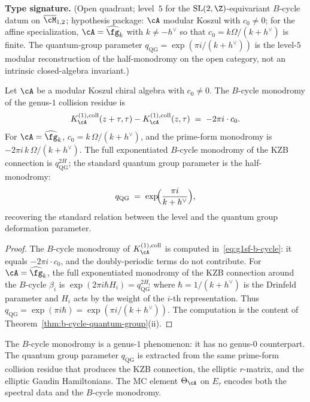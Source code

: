 \begin{theorem}
\label{thm:g1sf-b-cycle-monodromy}
\textbf{Type signature.} (Open quadrant; level~$5$ for the
$\mathrm{SL}(2,\Z)$-equivariant $B$-cycle datum on
$\overline{\cM}_{1,2}$; hypothesis package: $\cA$ modular Koszul
with $c_0\neq 0$; for the affine specialization,
$\cA=\widehat{\fg}_k$ with $k\neq -h^\vee$ so that $c_0=k\Omega/(k+h^\vee)$
is finite. The quantum-group parameter
$q_{\mathrm{QG}} = \exp(\pi i/(k+h^\vee))$ is the level-$5$ modular
reconstruction of the half-monodromy on the open category, not an
intrinsic closed-algebra invariant.)

Let $\cA$ be a modular Koszul chiral algebra with $c_0 \neq 0$. The
$B$-cycle monodromy of the genus-$1$ collision residue is
\begin{equation}\label{eq:g1sf-b-cycle}
K_\cA^{(1),\mathrm{coll}}(z+\tau,\tau)
-K_\cA^{(1),\mathrm{coll}}(z,\tau)
\;=\;
-2\pi i \cdot c_0.
\end{equation}
For $\cA = \widehat{\fg}_k$, $c_0 = k\,\Omega/(k + h^\vee)$, and the
prime-form monodromy is $-2\pi i\, k\,\Omega/(k + h^\vee)$. The
full exponentiated $B$-cycle monodromy of the KZB connection is
$q_{\mathrm{QG}}^{2H}$; the standard quantum group parameter is the
half-monodromy:
\begin{equation}\label{eq:g1sf-quantum-parameter}
q_{\mathrm{QG}}
\;=\;
\exp\!\Bigl(\frac{\pi i}{k + h^\vee}\Bigr),
\end{equation}
recovering the standard relation between the level and the quantum
group deformation parameter.
\end{theorem}

\begin{proof}
The $B$-cycle monodromy of $K_\cA^{(1),\mathrm{coll}}$ is computed
in~\eqref{eq:g1sf-b-cycle}: it equals
$-2\pi i \cdot c_0$, and the doubly-periodic terms do not
contribute. For $\cA = \widehat{\fg}_k$, the full exponentiated
monodromy of the KZB connection around the $B$-cycle $\beta_i$
is $\exp(2\pi i \hbar H_i)=q_{\mathrm{QG}}^{2H_i}$ where
$\hbar = 1/(k + h^\vee)$ is the Drinfeld parameter and $H_i$ acts
by the weight of the $i$-th representation. Thus
$q_{\mathrm{QG}} = \exp(\pi i\hbar) = \exp(\pi i/(k + h^\vee))$. The
computation is the content of
Theorem~\ref{thm:b-cycle-quantum-group}(ii).
\end{proof}

\begin{remark}
\label{rem:g1sf-b-cycle-face-0}
The $B$-cycle monodromy is a genus-$1$ phenomenon: it
has no genus-$0$ counterpart. The quantum group parameter
$q_{\mathrm{QG}}$ is extracted from the same prime-form collision
residue that produces the KZB connection, the elliptic $r$-matrix, and
the elliptic Gaudin Hamiltonians. The MC element $\Theta_\cA$ on
$E_\tau$ encodes both the spectral data and the $B$-cycle monodromy.
\end{remark}

